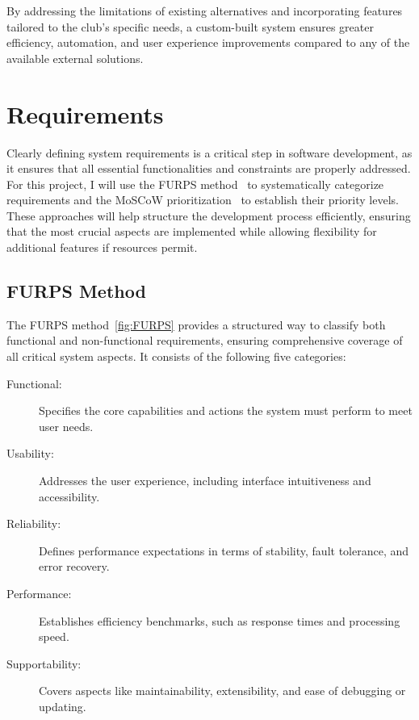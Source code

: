By addressing the limitations of existing alternatives and incorporating features tailored to the club’s specific needs, a custom-built system ensures greater efficiency, automation, and user experience improvements compared to any of the available external solutions.

\section{Requirements}

Clearly defining system requirements is a critical step in software development, as it ensures that all essential functionalities and constraints are properly addressed. For this project, I will use the FURPS method~\cite{FURPS} to systematically categorize requirements and the MoSCoW prioritization~\cite{MoSCoW} to establish their priority levels. These approaches will help structure the development process efficiently, ensuring that the most crucial aspects are implemented while allowing flexibility for additional features if resources permit.

\subsection{FURPS Method}

The FURPS method~\ref{fig:FURPS} provides a structured way to classify both functional and non-functional requirements, ensuring comprehensive coverage of all critical system aspects. It consists of the following five categories:

\begin{description}
  \item [Functional:] Specifies the core capabilities and actions the system must perform to meet user needs.
  \item [Usability:] Addresses the user experience, including interface intuitiveness and accessibility.
  \item [Reliability:] Defines performance expectations in terms of stability, fault tolerance, and error recovery.
  \item [Performance:] Establishes efficiency benchmarks, such as response times and processing speed.
  \item [Supportability:] Covers aspects like maintainability, extensibility, and ease of debugging or updating.
\end{description}

